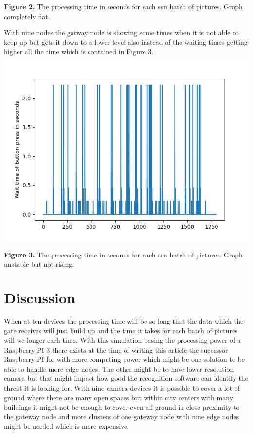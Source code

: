 \documentclass[a4paper,11pt,notitlepage,twocolumn]{article}
\begin{document}
    {\footnotesize \textbf{Figure 2.} The processing time in seconds for each sen batch of pictures.
    Graph completely flat.\par} With nine nodes the gatway node is
    showing some times when it is not able to keep up but gets it down to a lower level also
    instead of the waiting times getting higher all the time which is contained in Figure 3.
    \includegraphics[scale=0.5]{Figure_3.png} {\footnotesize \textbf{Figure 3.} The processing time
    in seconds for each sen batch of pictures. Graph unstable but not rising.\par}
    
  \section{Discussion}
    When at ten devices the processing time will be so long that the data which the gate receives
    will just build up and the time it takes for each batch of pictures will we longer each time.
    With this simulation basing the processing power of a Raspberry PI 3 there exists at the time
    of writing this article the successor Raspberry PI for with more computing power which
    might be one solution to be able to handle more edge nodes. The other might be to have lower
    resolution camera but that might impact how good the recognition software can identify
    the threat it is looking for. With nine camera devices it is possible to cover  a lot of
    ground where there are many open spaces but within city centers with many buildings it
    might not be enough to cover even all ground in close proximity to the gateway node
    and more clusters of one gateway node with nine edge nodes might be needed which
    is more expensive.
    
\end{document}
